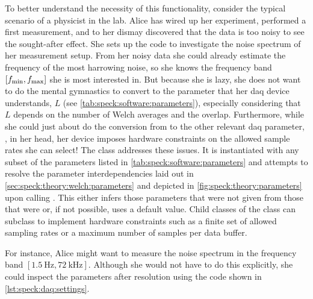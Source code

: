 To better understand the necessity of this functionality, consider the typical scenario of a physicist
in the lab.
Alice has wired up her experiment, performed a first measurement, and to her dismay discovered that the data is too noisy to see the sought-after effect.
She sets up the \pyspeck code to investigate the noise spectrum of her measurement setup.
From her noisy data she could already estimate the frequency of the most harrowing noise, so she knows the frequency band $[f_{\mathrm{min}}, f_{\mathrm{max}}]$ she is most interested in.
But because she is lazy,
she does not want to do the mental gymnastics to convert \fmin to the parameter that her \gls{daq} device understands, $L$ (see \cref{tab:speck:software:parameters}), especially considering that $L$ depends on the number of Welch averages and the overlap.
Furthermore, while she could just about do the conversion from \fmax to the other relevant \gls{daq} parameter, \fs, in her head, her device imposes hardware constraints on the allowed sample rates she can select!
The  class addresses these issues.
It is instantiated with any subset of the parameters listed in \cref{tab:speck:software:parameters}
and attempts to resolve the parameter interdependencies laid out in \cref{sec:speck:theory:welch:parameters} and depicted in \cref{fig:speck:theory:parameters} upon calling .
This either infers those parameters that were not given from those that were or, if not possible, uses a default value.
Child classes of the  class can subclass  to implement hardware constraints such as a finite set of allowed sampling rates or a maximum number of samples per data buffer.

For instance, Alice might want to measure the noise spectrum in the frequency band $[\qty{1.5}{\hertz}, \qty{72}{\kilo\hertz}]$.
Although she would not have to do this explicitly,
she could inspect the parameters after resolution using the code shown in \cref{lst:speck:daq:settings}.

